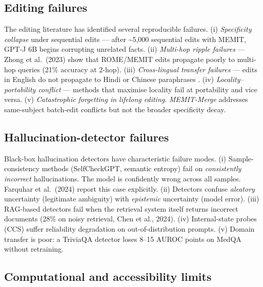 \documentclass{article}
\begin{document}
\subsection{Editing failures}\label{editing-failures}

The editing literature has identified several reproducible failures. (i) \emph{Specificity collapse} under sequential edits --- after \textasciitilde5,000 sequential edits with MEMIT, GPT-J 6B begins corrupting unrelated facts. (ii) \emph{Multi-hop ripple failures} --- Zhong et al.~(2023) show that ROME/MEMIT edits propagate poorly to multi-hop queries (21\% accuracy at 2-hop). (iii) \emph{Cross-lingual transfer failures} --- edits in English do not propagate to Hindi or Chinese paraphrases \citep{wang2023scottselfconsisten}. (iv) \emph{Locality--portability conflict} --- methods that maximise locality fail at portability and vice versa. (v) \emph{Catastrophic forgetting in lifelong editing}. \emph{MEMIT-Merge} \citep{dong2025memitmergeaddressi} addresses same-subject batch-edit conflicts but not the broader specificity decay.

\subsection{Hallucination-detector failures}\label{hallucination-detector-failures}

Black-box hallucination detectors have characteristic failure modes. (i) Sample-consistency methods (SelfCheckGPT, semantic entropy) fail on \emph{consistently incorrect} hallucinations. The model is confidently wrong across all samples. Farquhar et al.~(2024) report this case explicitly. (ii) Detectors confuse \emph{aleatory} uncertainty (legitimate ambiguity) with \emph{epistemic} uncertainty (model error). (iii) RAG-based detectors fail when the retrieval system itself returns incorrect documents (28\% on noisy retrieval, Chen et al., 2024). (iv) Internal-state probes (CCS) suffer reliability degradation on out-of-distribution prompts. (v) Domain transfer is poor: a TriviaQA detector loses 8--15 AUROC points on MedQA without retraining.

\subsection{Computational and accessibility limits}\label{computational-and-accessibility-limits}
\end{document}
